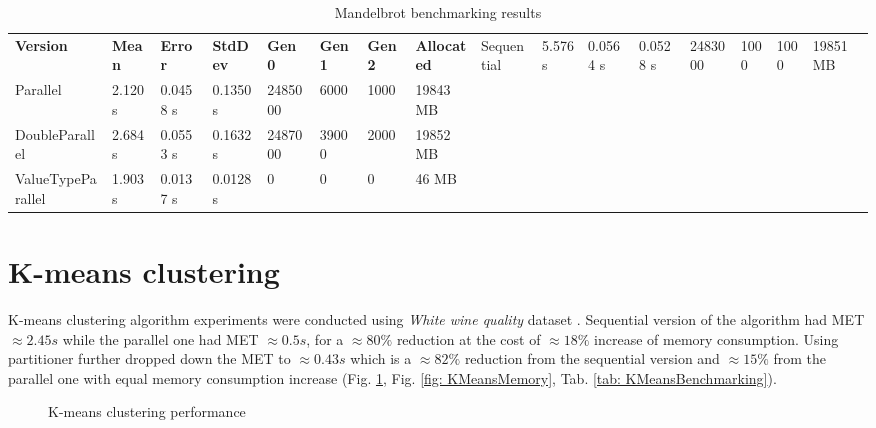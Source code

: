 \begin{sidewaystable}[!ht]
    \centering
    \caption{Mandelbrot benchmarking results}
		\label{tab: MandelbrotBenchmarking}
    \begin{tabular}{lp{3cm}p{1.5cm}p{1.5cm}p{2cm}p{2cm}p{2cm}p{2cm}}
			\toprule
			\bfseries Version 	&
			\bfseries Mean    	&
			\bfseries Error	    &
			\bfseries StdDev	  &
			\bfseries Gen 0	    &
			\bfseries Gen 1	    &
			\bfseries Gen 2	    &
			\bfseries Allocated &
			\midrule 
			Sequential & 5.576 s & 0.0564 s & 0.0528 s & 2483000 & 1000 & 1000 & 19851 MB \\ 
			Parallel & 2.120 s & 0.0458 s & 0.1350 s & 2485000 & 6000 & 1000 & 19843 MB \\ 
			DoubleParallel & 2.684 s & 0.0553 s & 0.1632 s & 2487000 & 39000 & 2000 & 19852 MB \\ 
			ValueTypeParallel & 1.903 s & 0.0137 s & 0.0128 s & 0 & 0 & 0 & 46 MB \\ 
			\bottomrule
    \end{tabular}
\end{sidewaystable}

\clearpage
\section{K-means clustering}
K-means clustering algorithm experiments were conducted using \emph{White wine quality} dataset \cite{WhiteWine}. Sequential version of the algorithm had MET $\approx 2.45s$ while the parallel one had MET $\approx 0.5s$, for a $\approx 80\%$ reduction at the cost of $\approx 18\%$ increase of memory consumption. Using partitioner further dropped down the MET to $\approx 0.43s$ which is a $\approx 82\%$ reduction from the sequential version and $\approx 15\%$ from the parallel one with equal memory consumption increase (Fig. \ref{fig: KMeansPerformance}, Fig. \ref{fig: KMeansMemory}, Tab. \ref{tab: KMeansBenchmarking}).

\begin{figure}[!ht]
\centering
{}
\caption{K-means clustering  performance}
\label{fig: KMeansPerformance}
\end{figure}

